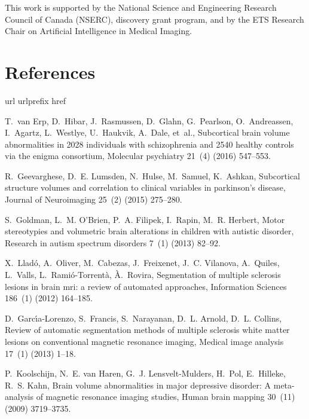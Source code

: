 \documentclass[twoside,fleqn,espcrc2]{elsarticle}
\begin{document}
This work is supported by the National Science and Engineering Research Council of Canada (NSERC), discovery grant program, and by the ETS Research Chair on Artificial Intelligence in Medical Imaging.

\section*{References}


\begin{thebibliography}{10}
\expandafter\ifx\csname url\endcsname\relax
  \def\url#1{\texttt{#1}}\fi
\expandafter\ifx\csname urlprefix\endcsname\relax\def\urlprefix{URL }\fi
\expandafter\ifx\csname href\endcsname\relax
  \def\href#1#2{#2} \def\path#1{#1}\fi

T.~van Erp, D.~Hibar, J.~Rasmussen, D.~Glahn, G.~Pearlson, O.~Andreassen, I.~Agartz, L.~Westlye, U.~Haukvik, A.~Dale, et~al., Subcortical brain volume abnormalities in 2028 individuals with schizophrenia and 2540 healthy controls via the enigma consortium, Molecular psychiatry 21~(4) (2016) 547--553.

R.~Geevarghese, D.~E. Lumsden, N.~Hulse, M.~Samuel, K.~Ashkan, Subcortical
  structure volumes and correlation to clinical variables in parkinson's
  disease, Journal of Neuroimaging 25~(2) (2015) 275--280.

S.~Goldman, L.~M. O'Brien, P.~A. Filipek, I.~Rapin, M.~R. Herbert, Motor
  stereotypies and volumetric brain alterations in children with autistic
  disorder, Research in autism spectrum disorders 7~(1) (2013) 82--92.

X.~Llad{\'o}, A.~Oliver, M.~Cabezas, J.~Freixenet, J.~C. Vilanova, A.~Quiles,
  L.~Valls, L.~Rami{\'o}-Torrent{\`a}, {\`A}.~Rovira, Segmentation of multiple
  sclerosis lesions in brain mri: a review of automated approaches, Information
  Sciences 186~(1) (2012) 164--185.

D.~Garc{\'\i}a-Lorenzo, S.~Francis, S.~Narayanan, D.~L. Arnold, D.~L. Collins,
  Review of automatic segmentation methods of multiple sclerosis white matter
  lesions on conventional magnetic resonance imaging, Medical image analysis
  17~(1) (2013) 1--18.

P.~Koolschijn, N.~E. van Haren, G.~J. Lensvelt-Mulders, H.~Pol, E.~Hilleke,
  R.~S. Kahn, Brain volume abnormalities in major depressive disorder: A
  meta-analysis of magnetic resonance imaging studies, Human brain mapping
  30~(11) (2009) 3719--3735.


\end{thebibliography}
\end{document}
